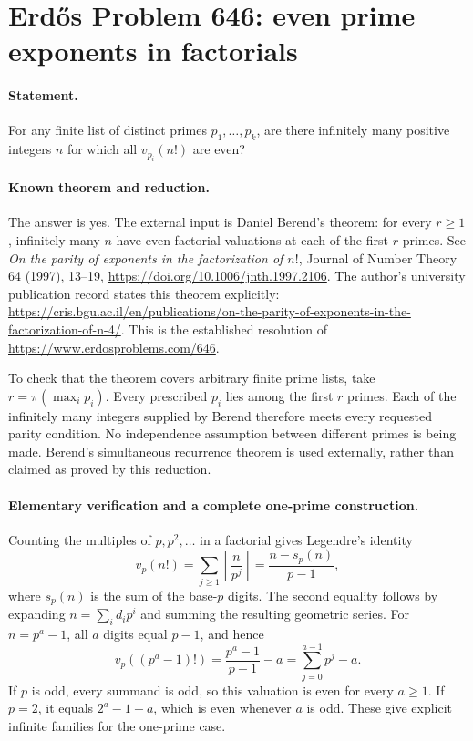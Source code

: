 \section*{Erd\H{o}s Problem 646: even prime exponents in factorials}

\paragraph{Statement.}
For any finite list of distinct primes \(p_1,\ldots,p_k\), are there
infinitely many positive integers \(n\) for which all
\(v_{p_i}(n!)\) are even?

\paragraph{Known theorem and reduction.}
The answer is yes. The external input is Daniel Berend's theorem:
for every \(r\geq1\), infinitely many \(n\) have even factorial
valuations at each of the first \(r\) primes.
See \emph{On the parity of exponents in the factorization of \(n!\)},
Journal of Number Theory 64 (1997), 13--19,
\url{https://doi.org/10.1006/jnth.1997.2106}.
The author's university publication record states this theorem explicitly:
\url{https://cris.bgu.ac.il/en/publications/on-the-parity-of-exponents-in-the-factorization-of-n-4/}.
This is the established resolution of
\url{https://www.erdosproblems.com/646}.

To check that the theorem covers arbitrary finite prime lists, take
\(r=\pi(\max_i p_i)\). Every prescribed \(p_i\) lies among the first
\(r\) primes. Each of the infinitely many integers supplied by
Berend therefore meets every requested parity condition.
No independence assumption between different primes is being made.
Berend's simultaneous recurrence theorem is used externally, rather
than claimed as proved by this reduction.

\paragraph{Elementary verification and a complete one-prime construction.}
Counting the multiples of \(p,p^2,\ldots\) in a factorial gives
Legendre's identity
\[
 v_p(n!)=\sum_{j\geq1}\left\lfloor\frac n{p^j}\right\rfloor
        =\frac{n-s_p(n)}{p-1},
\]
where \(s_p(n)\) is the sum of the base-\(p\) digits.
The second equality follows by expanding
\(n=\sum_i d_ip^i\) and summing the resulting geometric series.
For \(n=p^a-1\), all \(a\) digits equal \(p-1\), and hence
\[
 v_p((p^a-1)!)=\frac{p^a-1}{p-1}-a
              =\sum_{j=0}^{a-1}p^j-a.
\]
If \(p\) is odd, every summand is odd, so this valuation is even
for every \(a\geq1\). If \(p=2\), it equals \(2^a-1-a\), which
is even whenever \(a\) is odd. These give explicit infinite
families for the one-prime case.

